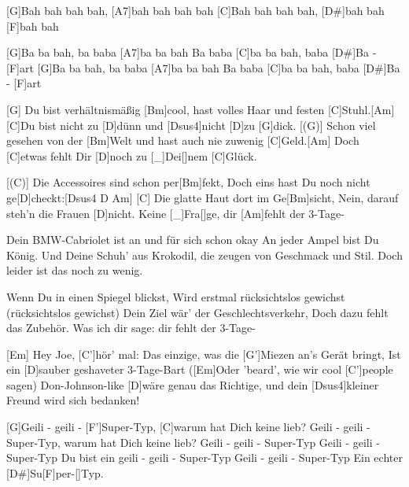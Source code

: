 

\begin{guitar}
	[G]Bah bah bah bah, [A7]bah bah bah bah
	[C]Bah bah bah bah, [D#]bah bah [F]bah bah
	
	[G]Ba ba bah, ba baba [A7]ba ba bah
	Ba baba [C]ba ba bah, baba [D#]Ba - [F]art
	[G]Ba ba bah, ba baba [A7]ba ba bah
	Ba baba [C]ba ba bah, baba [D#]Ba - [F]art
	
	[G] Du bist verhältnismäßig [Bm]cool, hast volles Haar und festen [C]Stuhl.[Am]{}
	[C]Du bist nicht zu [D]dünn und [{\color{gray}Dsus4}]nicht [{\color{gray}D}]zu [G]dick.
	[(G)] Schon viel gesehen von der [Bm]Welt und hast auch nie zuwenig [C]Geld.[Am]{}
	Doch [C]etwas fehlt Dir [D]noch zu [_]{Dei}[]nem [C]Glück.
	
	[(C)] Die Accessoires sind schon per[Bm]fekt, 
	Doch eins hast Du noch nicht ge[D]checkt:[{\color{gray}Dsus4 D}  Am]{}
	[C] Die glatte Haut dort im Ge[Bm]sicht, 
	Nein, darauf steh'n die Frauen [D]nicht. Keine [_]{Fra}[]ge, dir [Am]fehlt der 3-Tage-
	
	 
	
	Dein BMW-Cabriolet ist an und für sich schon okay
	An jeder Ampel bist Du König.
	Und Deine Schuh' aus Krokodil, die zeugen von Geschmack und Stil.
	Doch leider ist das noch zu wenig.
	
	\pagebreak
	Wenn Du in einen Spiegel blickst,
	Wird erstmal rücksichtslos gewichst (rücksichtslos gewichst)
	Dein Ziel wär' der Geschlechtsverkehr,
	Doch dazu fehlt das Zubehör. Was ich dir sage: dir fehlt der 3-Tage-
	
	 
	
	[Em] Hey Joe, [C']hör' mal:
	Das einzige, was die [G']Miezen an's Gerät bringt,
	Ist ein [D]sauber geshaveter 3-Tage-Bart
	([Em]Oder 'beard', wie wir cool [C']people sagen)
	Don-Johnson-like [D]wäre genau das Richtige, 
	und dein [Dsus4]kleiner Freund wird sich bedanken!
	
	[G]Geili - geili - [F']Super-Typ, [C]warum hat Dich keine lieb?
	Geili - geili - Super-Typ, warum hat Dich keine lieb?
	Geili - geili - Super-Typ
	Geili - geili - Super-Typ
	Du bist ein geili - geili - Super-Typ
	Geili - geili - Super-Typ
	Ein echter [D#]Su[F]per-[]Typ.
	
\end{guitar}